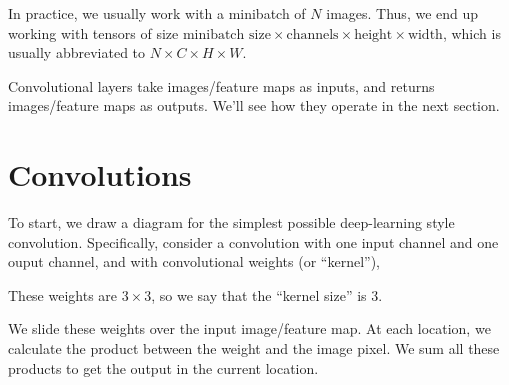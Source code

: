 \documentclass{article}
\begin{document}
In practice, we usually work with a minibatch of $N$ images. 
Thus, we end up working with tensors of size $\text{minibatch size} \times \text{channels} \times \text{height} \times \text{width}$, which is usually abbreviated to $N \times C\times H \times W$.

Convolutional layers take images/feature maps as inputs, and returns images/feature maps as outputs.
We'll see how they operate in the next section.


\clearpage
\FloatBarrier
\section{Convolutions}

To start, we draw a diagram for the simplest possible deep-learning style convolution.
Specifically, consider a convolution with one input channel and one ouput channel, and with convolutional weights (or ``kernel''),
\begin{figure}[H]
    \centering
\end{figure}
These weights are $3 \times 3$, so we say that the ``kernel size'' is 3.

We slide these weights over the input image/feature map.
At each location, we calculate the product between the weight and the image pixel.
We sum all these products to get the output in the current location.
\newcommand{\convfig}[3]{
\begin{minipage}{0.32\textwidth}
\centering
$x=#2, y=#3$
\texttt{[image: \#1]}
\end{minipage}}
\end{document}
